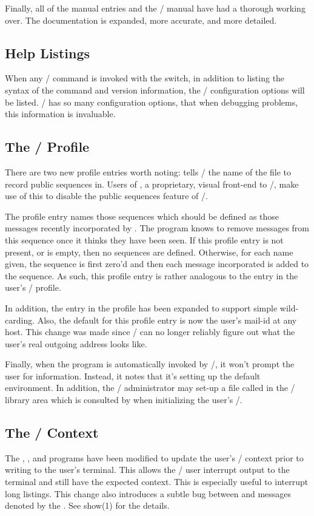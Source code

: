 Finally, all of the manual entries and the \MH/ manual have had a thorough
working over.
The documentation is expanded, more accurate, and more detailed.

\subsection*	{Help Listings}
When any \MH/ command is invoked with the  switch,
in addition to listing the syntax of the command and version information,
the \MH/ configuration options will be listed.
\MH/ has so many configuration options,
that when debugging problems, this information is invaluable.

\subsection*	{The \MH/ Profile}
There are two new profile entries worth noting:
 tells \MH/ the name of the file to record public
sequences in.
Users of , a proprietary, visual front-end to \MH/,
make use of this to disable the public sequences feature of \MH/.

The profile entry  names those sequences which should be
defined as those messages recently incorporated by .
The  program knows to remove messages from this sequence once it
thinks they have been seen.
If this profile entry is not present, or is empty, then no sequences are
defined.
Otherwise, for each name given, the sequence is first zero'd and then each
message incorporated is added to the sequence.
As such, this profile entry is rather analogous to the
 entry in the user's \MH/ profile.

In addition, the  entry in the profile has been
expanded to support simple wild-carding.
Also, the default for this profile entry is now the user's mail-id at any host.
This change was made since \MH/ can no longer reliably figure out what
the user's real outgoing address looks like.

Finally,
when the  program is automatically invoked by \MH/,
it won't prompt the user for information.
Instead, it notes that it's setting up the default environment.
In addition,
the \MH/ administrator may set-up a file called  in the \MH/
library area which is consulted by  when initializing the
user's \profile/.

\subsection*	{The \MH/ Context}
The , , and  programs have been modified to
update the user's \MH/ context prior to writing to the user's terminal.
This allows the \MH/ user interrupt output to the terminal and still have the
expected context.
This is especially useful to interrupt long  listings.
This change also introduces a subtle bug between  and messages
denoted by the .
See \man show(1) for the details.

